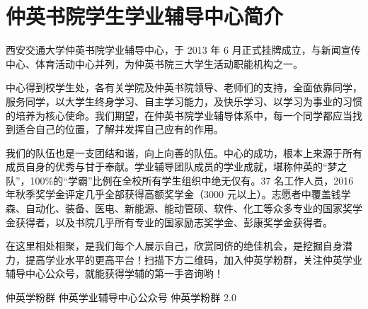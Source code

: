 \chapter*{仲英书院学生学业辅导中心简介}

西安交通大学仲英书院学业辅导中心，于 2013 年 6 月正式挂牌成立，与新闻宣传中心、体育活动中心并列，为仲英书院三大学生活动职能机构之一。

中心得到校学生处，各有关学院及仲英书院领导、老师们的支持，全面依靠同学，服务同学，以大学生终身学习、自主学习能力，及快乐学习、以学习为事业的习惯的培养为核心使命。我们期望，在仲英书院学业辅导体系中，每一个同学都应当找到适合自己的位置，了解并发挥自己应有的作用。

我们的队伍也是一支团结和谐，向上向善的队伍。中心的成功，根本上来源于所有成员自身的优秀与甘于奉献。学业辅导团队成员的学业成就，堪称仲英的“梦之队”，100\%的“学霸”比例在全校所有学生组织中绝无仅有。37 名工作人员，2016 年秋季奖学金评定几乎全部获得高额奖学金（3000 元以上）。志愿者中覆盖钱学森、自动化、装备、医电、新能源、能动管硕、软件、化工等众多专业的国家奖学金获得者，以及书院几乎所有专业的国家励志奖学金、彭康奖学金获得者。

在这里相处相聚，是我们每个人展示自己，欣赏同侪的绝佳机会，是挖掘自身潜力，提高学业水平的更高平台！扫描下方二维码，加入仲英学粉群，关注仲英学业辅导中心公众号，就能获得学辅的第一手咨询哟！

仲英学粉群 仲英学业辅导中心公众号 仲英学粉群 2.0